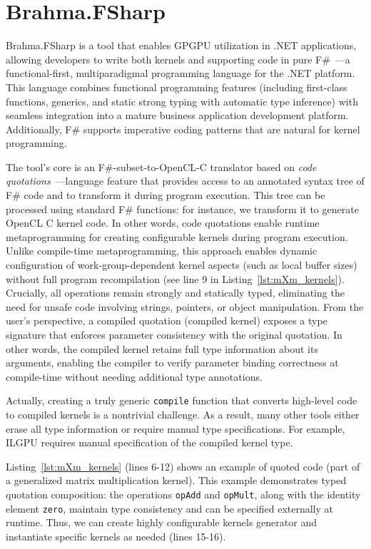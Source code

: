 \section{Brahma.FSharp}

Brahma.FSharp is a tool that enables GPGPU utilization in .NET applications, allowing developers to write both kernels and supporting code in pure F\#~\cite{fsharp}---a functional-first, multiparadigmal programming language for the .NET platform.
This language combines functional programming features (including first-class functions, generics, and static strong typing with automatic type inference) with seamless integration into a mature business application development platform.
Additionally, F\# supports imperative coding patterns that are natural for kernel programming.

The tool's core is an F\#-subset-to-OpenCL-C translator based on \emph{code quotations}~\cite{FSharpQuotations}---language feature that provides access to an annotated syntax tree of F\# code and to transform it during program execution.
This tree can be processed using standard F\# functions: for instance, we transform it to generate OpenCL C kernel code.
In other words, code quotations enable runtime metaprogramming for creating configurable kernels during program execution.
Unlike compile-time metaprogramming, this approach enables dynamic configuration of work-group-dependent kernel aspects (such as local buffer sizes) without full program recompilation (see line 9 in Listing~\ref{lst:mXm_kernels}). 
Crucially, all operations remain strongly and statically typed, eliminating the need for unsafe code involving strings, pointers, or object manipulation.
From the user's perspective, a compiled quotation (compiled kernel) exposes a type signature that enforces parameter consistency with the original quotation.
In other words, the compiled kernel retains full type information about its arguments, enabling the compiler to verify parameter binding correctness at compile-time without needing additional type annotations.

Actually, creating a truly generic \texttt{compile} function that converts high-level code to compiled kernels is a nontrivial challenge. 
As a result, many other tools either erase all type information or require manual type specifications. 
For example, ILGPU requires manual specification of the compiled kernel type.

Listing~\ref{lst:mXm_kernels} (lines 6-12) shows an example of quoted code (part of a generalized matrix multiplication kernel).
This example demonstrates typed quotation composition: the operations \verb|opAdd| and \verb|opMult|, along with the identity element \verb|zero|, maintain type consistency and can be specified externally at runtime.
Thus, we can create highly configurable kernels generator and instantiate specific kernels as needed (lines 15-16).

